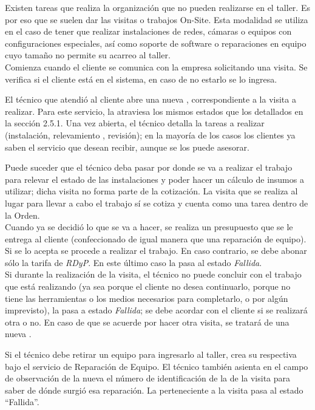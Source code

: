 \documentclass[12pt]{extarticle}
\begin{document}
\begin{spacing}{1.2}
    Existen tareas que realiza la organización que no pueden realizarse en el taller. Es por eso que se suelen dar las visitas o trabajos On-Site. Esta modalidad se utiliza en el caso de tener que realizar instalaciones de redes, cámaras o equipos con configuraciones especiales, así como soporte de software o reparaciones en equipo cuyo tamaño no permite su acarreo al taller.\\

    Comienza cuando el cliente se comunica con la empresa solicitando una visita. Se verifica si el cliente está en el sistema, en caso de no estarlo se lo ingresa.

    El técnico que atendió al cliente abre una nueva \OT{}, correspondiente a la visita a realizar. Para este servicio, la \OT{} atraviesa los mismos estados que los detallados en la sección 2.5.1.
    Una vez abierta, el técnico detalla la tareas a realizar (instalación, relevamiento , revisión); en la mayoría de los casos los clientes ya saben el servicio que desean recibir, aunque se los puede asesorar.

    Puede suceder que el técnico deba pasar por donde se va a realizar el trabajo para relevar el estado de las instalaciones y poder hacer un cálculo de insumos a utilizar; dicha visita no forma parte de la cotización. La visita que se realiza al lugar para llevar a cabo el trabajo sí se cotiza y cuenta como una tarea dentro de la Orden.\\

    Cuando ya se decidió lo que se va a hacer, se realiza un presupuesto que se le entrega al cliente (confeccionado de igual manera que una reparación de equipo). Si se lo acepta se procede a realizar el trabajo. En caso contrario, se debe abonar sólo la tarifa de \textit{RDyP}. En este último caso la \OT{} pasa al estado \textit{Fallida}.\\

    Si durante la realización de la visita, el técnico no puede concluir con el trabajo que está realizando (ya sea porque el cliente no desea continuarlo, porque no tiene las herramientas o los medios necesarios para completarlo, o por algún imprevisto), la \OT{} pasa a estado \textit{Fallida}; se debe acordar con el cliente si se realizará otra o no. En caso de que se acuerde por hacer otra visita, se tratará de una nueva \OT{}.
    
    Si el técnico debe retirar un equipo para ingresarlo al taller, crea su respectiva \OT{} bajo el servicio de Reparación de Equipo. El técnico también asienta en el campo de observación de la nueva \OT{} el número de identificación de la \OT{} de la visita para saber de dónde surgió esa reparación. La \OT{} perteneciente a la visita pasa al estado ``Fallida''.\\


\end{spacing}
\end{document}

